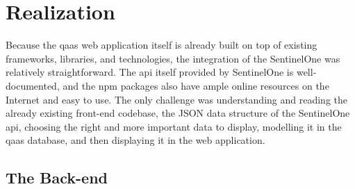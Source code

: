 \chapter{Realization}
\begin{multicols}{2}
      Because the \acrshort{qaas} web application itself is already built on top of existing frameworks, libraries, and technologies, the
      integration of the SentinelOne was relatively straightforward. The \acrshort{api} itself provided by SentinelOne is well-documented,
      and the \acrshort{npm} packages also have ample online resources on the Internet and easy to use. The only challenge was understanding
      and reading the already existing front-end codebase, the JSON data structure of the SentinelOne \acrshort{api}, choosing the right
      and more important  data to display, modelling it in the \acrshort{qaas} database, and then displaying it in the web application.

      \section{The Back-end}



\end{multicols}
